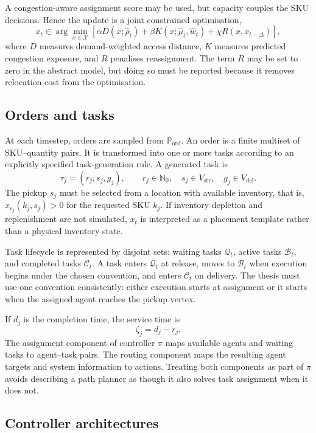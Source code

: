 \documentclass[../main.tex]{subfiles}
\begin{document}
A congestion-aware assignment score may be used, but capacity couples the SKU
decisions. Hence the update is a joint constrained optimisation,
\[
x_t\in\arg\min_{x\in\mathcal{X}}
\left[
 \alpha D(x;\widehat\rho_t)
 +\beta K(x;\widehat\mu_t,\widehat w_t)
 +\chi R(x,x_{t-\Delta})
\right],
\]
where \(D\) measures demand-weighted access distance, \(K\) measures predicted
congestion exposure, and \(R\) penalises reassignment. The term \(R\) may be
set to zero in the abstract model, but doing so must be reported because it
removes relocation cost from the optimisation.

\subsection{Orders and tasks}

At each timestep, orders are sampled from
\(\mathbb{P}_{\mathrm{ord}}\). An order is a finite multiset of SKU--quantity
pairs. It is transformed into one or more tasks according to an explicitly
specified task-generation rule. A generated task is
\[
\tau_j=(r_j,s_j,g_j),
\qquad
r_j\in\mathbb{N}_0,
\quad s_j\in V_{\mathrm{str}},
\quad g_j\in V_{\mathrm{del}}.
\]
The pickup \(s_j\) must be selected from a location with available inventory,
that is, \(x_{r_j}(k_j,s_j)>0\) for the requested SKU \(k_j\). If inventory
depletion and replenishment are not simulated, \(x_t\) is interpreted as a
placement template rather than a physical inventory state.

Task lifecycle is represented by disjoint sets: waiting tasks
\(\mathcal{Q}_t\), active tasks \(\mathcal{B}_t\), and completed tasks
\(\mathcal{C}_t\). A task enters \(\mathcal{Q}_t\) at release, moves to
\(\mathcal{B}_t\) when execution begins under the chosen convention, and enters
\(\mathcal{C}_t\) on delivery. The thesis must use one convention consistently:
either execution starts at assignment or it starts when the assigned agent
reaches the pickup vertex.

If \(d_j\) is the completion time, the service time is
\[
\zeta_j=d_j-r_j.
\]
The assignment component of controller \(\pi\) maps available agents and
waiting tasks to agent--task pairs. The routing component maps the resulting
agent targets and system information to actions. Treating both components as
part of \(\pi\) avoids describing a path planner as though it also solves task
assignment when it does not.

\subsection{Controller architectures}
\end{document}
